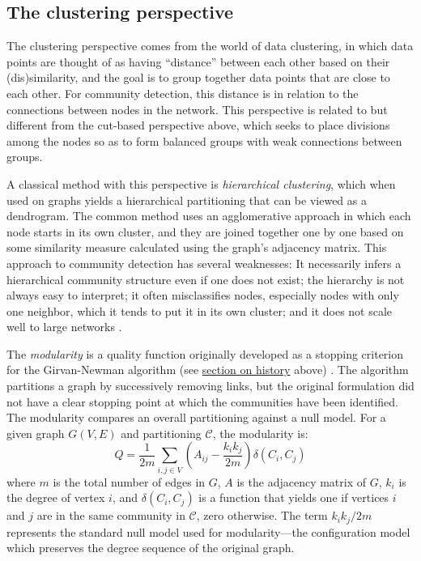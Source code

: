 \hypertarget{the-clustering-perspective}{\subsection{The clustering
perspective}\label{the-clustering-perspective}}

The clustering perspective comes from the world of data clustering, in
which data points are thought of as having ``distance'' between each
other based on their (dis)similarity, and the goal is to group together
data points that are close to each other. For community detection, this
distance is in relation to the connections between nodes in the network.
This perspective is related to but different from the cut-based
perspective above, which seeks to place divisions among the nodes so as
to form balanced groups with weak connections between groups.

A classical method with this perspective is \emph{hierarchical
clustering}, which when used on graphs yields a hierarchical
partitioning that can be viewed as a dendrogram. The common method uses
an agglomerative approach in which each node starts in its own cluster,
and they are joined together one by one based on some similarity measure
calculated using the graph's adjacency matrix. This approach to
community detection has several weaknesses: It necessarily infers a
hierarchical community structure even if one does not exist; the
hierarchy is not always easy to interpret; it often misclassifies nodes,
especially nodes with only one neighbor, which it tends to put it in its
own cluster; and it does not scale well to large networks
\autocite{fortunato_community_2010}.

The \emph{modularity} is a quality function originally developed as a
stopping criterion for the Girvan-Newman algorithm (see
\protect\hyperlink{history}{section on history} above)
\autocites{newman_finding_2004}{newman_modularity_2006}. The algorithm
partitions a graph by successively removing links, but the original
formulation did not have a clear stopping point at which the communities
have been identified. The modularity compares an overall partitioning
against a null model. For a given graph \(G(V, E)\) and partitioning
\(\mathcal{C}\), the modularity is:
\[Q = \frac{1}{2m} \sum_{i,j \in V} \left(A_{ij} - \frac{k_i k_j}{2m}\right) \delta(C_i, C_j)\]
where \(m\) is the total number of edges in \(G\), \(A\) is the
adjacency matrix of \(G\), \(k_i\) is the degree of vertex \(i\), and
\(\delta(C_i, C_j)\) is a function that yields one if vertices \(i\) and
\(j\) are in the same community in \(\mathcal{C}\), zero otherwise. The
term \(k_i k_j / 2m\) represents the standard null model used for
modularity---the configuration model which preserves the degree sequence
of the original graph.

